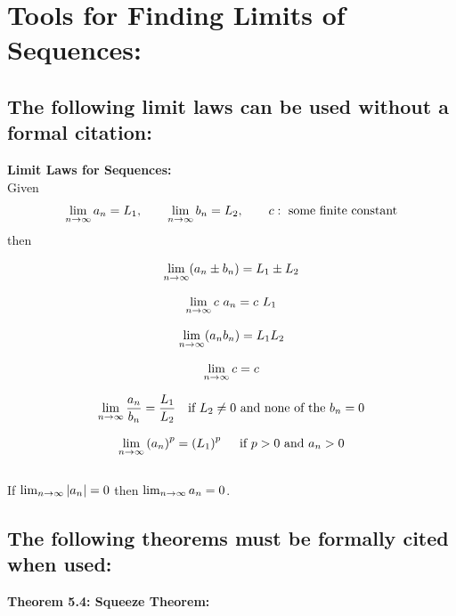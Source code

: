 \pagebreak

\section*{Tools for Finding Limits of Sequences:}\label{limitlaws}

\subsection*{The following limit laws can be used without a formal citation:}
\textbf{Limit Laws for Sequences:}\\
Given 
\[
\lim_{n\rightarrow\infty} a_n = L_1, \qquad \lim_{n\rightarrow\infty} b_n = L_2, \qquad c:\text{ some finite constant}
\]
then

\[ \lim_{n\rightarrow\infty} ( a_n \pm b_n) = L_1 \pm L_2\]

\[ \lim_{n\rightarrow\infty} c\ a_n = c\ L_1\]

\[ \lim_{n\rightarrow\infty} (a_n b_n) = L_1 L_2\]

\[ \lim_{n\rightarrow\infty} c = c\]



\[ \lim_{n\rightarrow\infty} \frac{a_n}{b_n} = \frac{L_1}{L_2} \quad \text{if } L_2 \neq 0 \text{ and none of the } b_n = 0\]

\[ \lim_{n\rightarrow\infty} \left(a_n\right)^p = \left(L_1\right)^p \quad \text{ if } p>0 \text{ and } a_n > 0\]
~\\

If \(\lim_{n\rightarrow\infty} | a_n | = 0\) then \(\lim_{n\rightarrow\infty} a_n = 0\).


\vspace*{.1in}

\subsection*{The following theorems must be formally cited when used:}




\textbf{Theorem 5.4: Squeeze Theorem:}\\

